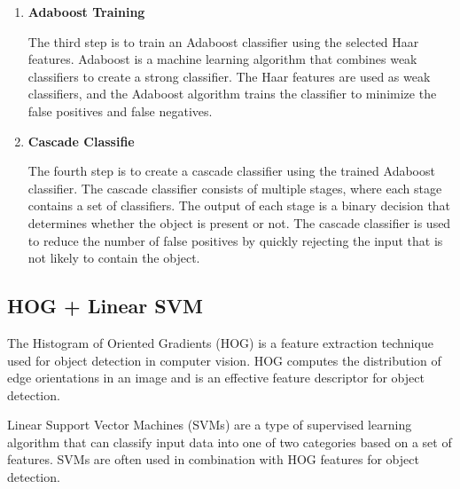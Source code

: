 \begin{enumerate}
            \item \textbf{Adaboost Training}
        
            The third step is to train an Adaboost classifier using the selected Haar features. 
            Adaboost is a machine learning algorithm that combines weak classifiers to create a strong classifier. 
            The Haar features are used as weak classifiers, and the Adaboost algorithm trains the classifier to minimize the false positives and false negatives.
        
            \item \textbf{Cascade Classifie}
        
            The fourth step is to create a cascade classifier using the trained Adaboost classifier. 
            The cascade classifier consists of multiple stages, where each stage contains a set of classifiers. 
            The output of each stage is a binary decision that determines whether the object is present or not. 
            The cascade classifier is used to reduce the number of false positives by quickly rejecting the input that is not likely to contain the object.

        \end{enumerate}

    \subsection{HOG + Linear SVM}
    The Histogram of Oriented Gradients (HOG) is a feature extraction technique used for object detection in computer vision. 
    HOG computes the distribution of edge orientations in an image and is an effective feature descriptor for object detection.

    Linear Support Vector Machines (SVMs) are a type of supervised learning algorithm that can classify input data into one of two categories based on a set of features. 
    SVMs are often used in combination with HOG features for object detection.
    \cite{hgms:hog-multiscale}

